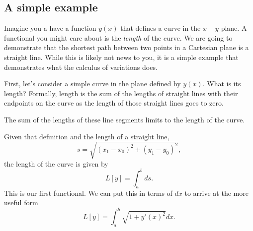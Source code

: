 
\subsection{A simple example}
Imagine you a have a function $y(x)$ that defines a curve in the $x-y$ plane. A functional you might care about is the \emph{length} of the curve. We are going to demonstrate that the shortest path between two points in a Cartesian plane is a straight line. While this is likely not news to you, it is a simple example that demonstrates what the calculus of variations does.

First, let's consider a simple curve in the plane defined by $y(x)$. What is its length? Formally, length is the sum of the lengths of straight lines with their endpoints on the curve as the length of those straight lines goes to zero. 
\begin{marginfigure}
  \caption{The sum of the lengths of these line segments limits to the length of the curve.}
\end{marginfigure}
Given that definition and the length of a straight line,
\begin{equation}
  \label{eq:line_seg}
  s = \sqrt{(x_1 - x_0)^2 + (y_1 - y_0)^2},  
\end{equation}
the length of the curve is given by
\begin{equation}
  \label{eq:curve_length_1}
  L[y] = \int_a^b ds.
\end{equation}
This is our first functional. We can put this in terms of $dx$ to arrive at the more useful form
\begin{equation}
  \label{eq:curve_length_final}
  L[y] = \int_a^b \sqrt{1 + y'(x)^2} dx.
\end{equation}

